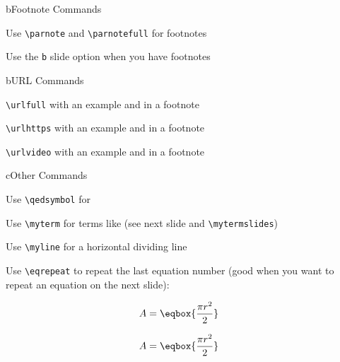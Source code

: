 \begin{myslidefragile}{b}{Footnote Commands}

Use \lstinline{\parnote} and \lstinline{\parnotefull} for footnotes

Use the \lstinline{b} slide option when you have footnotes

\end{myslidefragile}

\begin{myslidefragile}{b}{URL Commands}

\lstinline{\urlfull} with an example  and in a footnote

\lstinline{\urlhttps} with an example  and in a footnote

\lstinline{\urlvideo} with an example  and in a footnote

\end{myslidefragile}

\begin{myslidefragile}{c}{Other Commands}

Use \lstinline{\qedsymbol} for \qedsymbol

Use \lstinline{\myterm} for terms like  (see next slide and \lstinline{\mytermslides})

Use \lstinline{\myline} for a horizontal dividing line


Use \lstinline{\eqrepeat} to repeat the last equation number (good when you want to repeat an equation on the next slide):

\begin{align}
A & = \eqbox{\frac{\pi r^2}{2}}
\end{align}

\eqrepeat

\begin{align}
A & = \eqbox{\frac{\pi r^2}{2}}
\end{align}

\end{myslidefragile}

